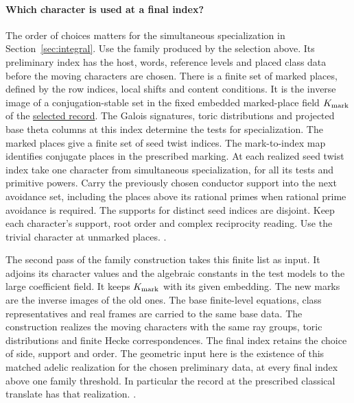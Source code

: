 \paragraph{Which character is used at a final index?}
%
The order of choices matters for the simultaneous specialization in
Section~\ref{sec:integral}. Use the family produced by the selection
above. Its preliminary index has the host, words, reference levels
and placed class data before the moving characters are chosen.
There is a finite set of marked places, defined by the row indices,
local shifts and content conditions. It is the inverse image of a
conjugation-stable set in the fixed embedded marked-place field
\(K_{\rm mark}\) of the
\hyperlink{proof.section-run-family-identification}{selected record}.
The Galois signatures, toric distributions and projected base
theta columns at this index determine the tests for specialization.
The marked places give a finite set of seed twist indices. The
mark-to-index map identifies conjugate places in the prescribed
marking. At each realized seed twist index take one character from
simultaneous specialization, for all its tests and primitive powers.
Carry the previously chosen conductor support into the next avoidance
set, including the places above its rational primes when rational
prime avoidance is required. The supports for distinct seed indices
are disjoint. Keep each character's support, root order and complex
reciprocity reading. Use the trivial character at unmarked places.
.

The second pass of the family construction takes this finite list
as input. It adjoins its character values and the algebraic
constants in the test models to the large coefficient field. It
keeps \(K_{\rm mark}\) with its given embedding. The new marks are the
inverse images of the old ones. The base finite-level equations,
class representatives and real frames are carried to the same
base data. The construction realizes the moving characters with
the same ray groups, toric distributions and finite Hecke
correspondences. The final index retains the choice of side,
support and order. The geometric input here is the existence of
this matched adelic realization for the chosen preliminary data,
at every final index above one family threshold. In particular the
record at the prescribed classical translate has that realization.
.

